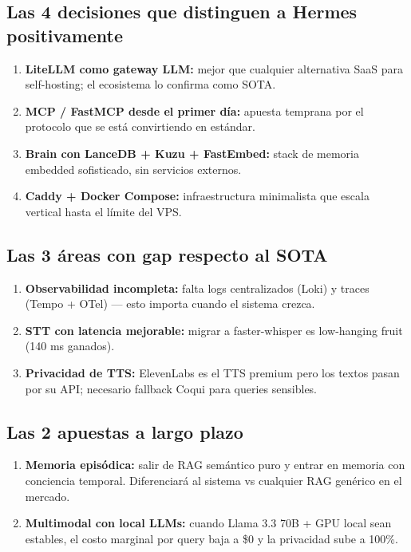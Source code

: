 \documentclass[11pt,a4paper]{article}
\begin{document}
\subsection{Las 4 decisiones que distinguen a Hermes positivamente}

\begin{enumerate}[leftmargin=*,itemsep=2pt]
\item \textbf{LiteLLM como gateway LLM:} mejor que cualquier alternativa SaaS para self-hosting; el ecosistema lo confirma como SOTA.
\item \textbf{MCP / FastMCP desde el primer día:} apuesta temprana por el protocolo que se está convirtiendo en estándar.
\item \textbf{Brain con LanceDB + Kuzu + FastEmbed:} stack de memoria embedded sofisticado, sin servicios externos.
\item \textbf{Caddy + Docker Compose:} infraestructura minimalista que escala vertical hasta el límite del VPS.
\end{enumerate}

\subsection{Las 3 áreas con gap respecto al SOTA}

\begin{enumerate}[leftmargin=*,itemsep=2pt]
\item \textbf{Observabilidad incompleta:} falta logs centralizados (Loki) y traces (Tempo + OTel) — esto importa cuando el sistema crezca.
\item \textbf{STT con latencia mejorable:} migrar a faster-whisper es low-hanging fruit (140 ms ganados).
\item \textbf{Privacidad de TTS:} ElevenLabs es el TTS premium pero los textos pasan por su API; necesario fallback Coqui para queries sensibles.
\end{enumerate}

\subsection{Las 2 apuestas a largo plazo}

\begin{enumerate}[leftmargin=*,itemsep=2pt]
\item \textbf{Memoria episódica:} salir de RAG semántico puro y entrar en memoria con conciencia temporal. Diferenciará al sistema vs cualquier RAG genérico en el mercado.
\item \textbf{Multimodal con local LLMs:} cuando Llama 3.3 70B + GPU local sean estables, el costo marginal por query baja a \$0 y la privacidad sube a 100\%.
\end{enumerate}
\end{document}
